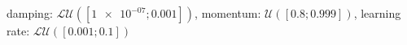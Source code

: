 damping: $\mathcal{LU}([\num[scientific-notation=true]{1e-07}; \num[scientific-notation=true]{0.001}])$, momentum: $\mathcal{U}([\num[scientific-notation=true]{0.8}; \num[scientific-notation=true]{0.999}])$, learning rate: $\mathcal{LU}([\num[scientific-notation=true]{0.001}; \num[scientific-notation=true]{0.1}])$